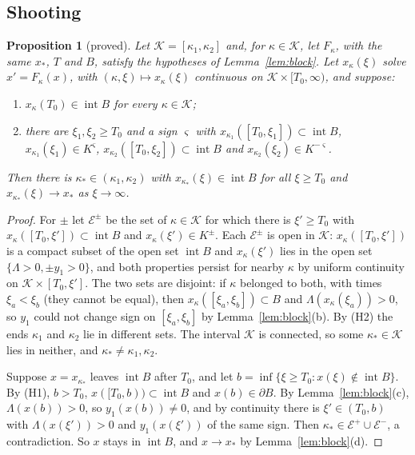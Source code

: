 \documentclass[11pt]{article}
\newtheorem{proposition}[lemma]{Proposition}
\theoremstyle{definition}
\newcommand{\Kset}{\mathcal{K}}
\newcommand{\xs}{x_*}
\begin{document}
\subsection{Shooting}\label{sec:shooting}

\begin{proposition}[proved]\label{prop:wazewski}
Let $\Kset = [\kappa_1, \kappa_2]$ and, for $\kappa \in \Kset$, let $F_\kappa$, with the same $\xs$, $T$ and $B$, satisfy the hypotheses of Lemma~\ref{lem:block}. Let $x_\kappa(\xi)$ solve $x' = F_\kappa(x)$, with $(\kappa, \xi) \mapsto x_\kappa(\xi)$ continuous on $\Kset \times [T_0, \infty)$, and suppose:
\begin{enumerate}
\item[(H1)] $x_\kappa(T_0) \in \operatorname{int} B$ for every $\kappa \in \Kset$;
\item[(H2)] there are $\xi_1, \xi_2 \ge T_0$ and a sign $\varsigma$ with $x_{\kappa_1}([T_0, \xi_1]) \subset \operatorname{int} B$, $x_{\kappa_1}(\xi_1) \in K^{\varsigma}$, $x_{\kappa_2}([T_0, \xi_2]) \subset \operatorname{int} B$ and $x_{\kappa_2}(\xi_2) \in K^{-\varsigma}$.
\end{enumerate}
Then there is $\kappa_* \in (\kappa_1, \kappa_2)$ with $x_{\kappa_*}(\xi) \in \operatorname{int} B$ for all $\xi \ge T_0$ and $x_{\kappa_*}(\xi) \to \xs$ as $\xi \to \infty$.
\end{proposition}

\begin{proof}
For $\pm$ let $\mathcal{E}^\pm$ be the set of $\kappa \in \Kset$ for which there is $\xi' \ge T_0$ with $x_\kappa([T_0, \xi']) \subset \operatorname{int} B$ and $x_\kappa(\xi') \in K^\pm$. Each $\mathcal{E}^\pm$ is open in $\Kset$: $x_\kappa([T_0, \xi'])$ is a compact subset of the open set $\operatorname{int} B$ and $x_\kappa(\xi')$ lies in the open set $\{\Lambda > 0, \pm y_1 > 0\}$, and both properties persist for nearby $\kappa$ by uniform continuity on $\Kset \times [T_0, \xi']$. The two sets are disjoint: if $\kappa$ belonged to both, with times $\xi_a < \xi_b$ (they cannot be equal), then $x_\kappa([\xi_a, \xi_b]) \subset B$ and $\Lambda(x_\kappa(\xi_a)) > 0$, so $y_1$ could not change sign on $[\xi_a, \xi_b]$ by Lemma~\ref{lem:block}(b). By (H2) the ends $\kappa_1$ and $\kappa_2$ lie in different sets. The interval $\Kset$ is connected, so some $\kappa_* \in \Kset$ lies in neither, and $\kappa_* \ne \kappa_1, \kappa_2$.

Suppose $x = x_{\kappa_*}$ leaves $\operatorname{int} B$ after $T_0$, and let $b = \inf\{\xi \ge T_0 : x(\xi) \notin \operatorname{int} B\}$. By (H1), $b > T_0$, $x([T_0, b)) \subset \operatorname{int} B$ and $x(b) \in \partial B$. By Lemma~\ref{lem:block}(c), $\Lambda(x(b)) > 0$, so $y_1(x(b)) \ne 0$, and by continuity there is $\xi' \in (T_0, b)$ with $\Lambda(x(\xi')) > 0$ and $y_1(x(\xi'))$ of the same sign. Then $\kappa_* \in \mathcal{E}^+ \cup \mathcal{E}^-$, a contradiction. So $x$ stays in $\operatorname{int} B$, and $x \to \xs$ by Lemma~\ref{lem:block}(d).
\end{proof}
\end{document}
